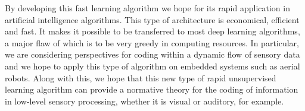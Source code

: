 \documentclass[a4paper, 11pt, draft]{article} %
\newcommand{\Acknowledgments}{%
This work was supported by XXX and the Doc2Amu project which received funding from a co-fund with the European Union's Horizon 2020 research and innovation programme and the region Provence Alpes Cote d'Azur. }
\begin{document}
%


 By developing this
fast learning algorithm we hope for its rapid application in artificial
intelligence algorithms. This type of architecture is economical,
efficient and fast. It makes it possible to be transferred to most deep
learning algorithms, a major flaw of which is to be very greedy in
computing resources. In particular, we are considering perspectives for
coding within a dynamic flow of sensory data and we hope to apply this
type of algorithm on embedded systems such as aerial robots. Along with
this, we hope that this new type of rapid unsupervised learning
algorithm can provide a normative theory for the coding of information
in low-level sensory processing, whether it is visual or auditory, for
example.




\printbibliography
\end{document}
